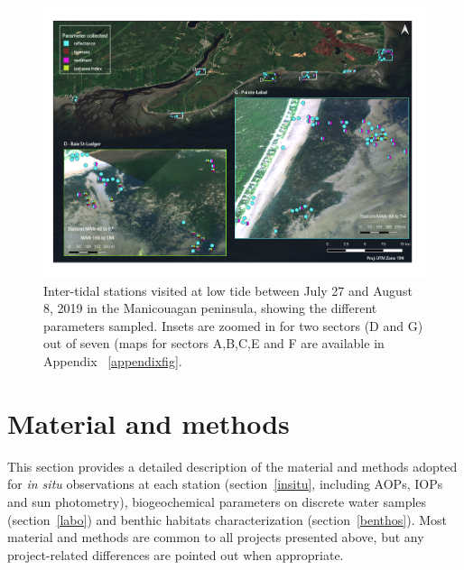 \documentclass[essd, manuscript]{copernicus}
\begin{document}
\begin{figure}
    \centering
    \includegraphics[width=15cm]{Figures/Fig2_intertidal_v3.png}
    \caption{Inter-tidal stations visited at low tide between July 27 and August 8, 2019 in the Manicouagan peninsula, showing the different parameters sampled. Insets are zoomed in for two sectors (D and G) out of seven (maps for sectors A,B,C,E and F are available in Appendix ~\ref{appendixfig}. }
    \label{fig:intertidal}
\end{figure}


\section{Material and methods}
This section provides a detailed description of the material and methods adopted for \textit{in situ} observations at each station (section~\ref{insitu}, including AOPs, IOPs and sun photometry), biogeochemical parameters on discrete water samples (section~\ref{labo}) and benthic habitats characterization (section~\ref{benthos}). Most material and methods are common to all projects presented above, but any project-related differences are pointed out when appropriate. 
\end{document}
